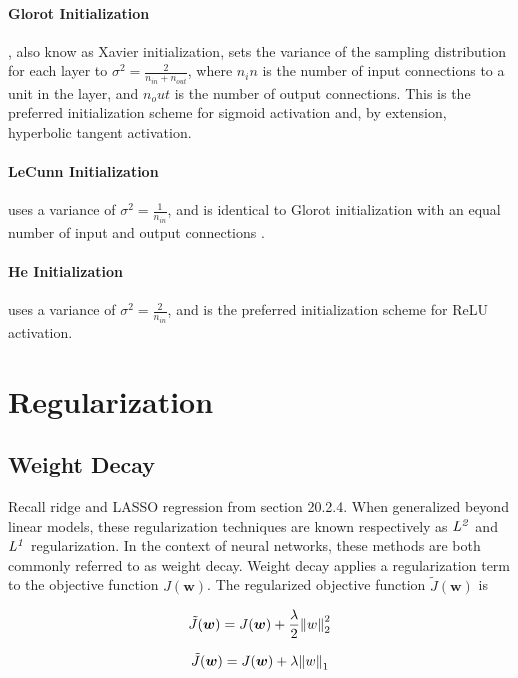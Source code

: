 \documentclass{article}
\begin{document}
\paragraph*{Glorot Initialization}, also know as Xavier initialization, sets the variance of the sampling distribution for each layer to \(\sigma^2 = \frac{2}{n_{in} + n_{out}}\), where \(n_in\) is the number of input connections to a unit in the layer, and \(n_out\) is the number of output connections. This is the preferred initialization scheme for sigmoid activation \cite{pml1book} and, by extension, hyperbolic tangent activation.

\paragraph*{LeCunn Initialization} uses a variance of \(\sigma^2 = \frac{1}{n_{in}}\), and is identical to Glorot initialization with an equal number of input and output connections \cite{pml1book}.

\paragraph*{He Initialization} uses a variance of \(\sigma^2 = \frac{2}{n_{in}}\), and is the preferred initialization scheme for ReLU activation. 

\section{Regularization} %

\subsection{Weight Decay} %

Recall ridge and LASSO regression from section 20.2.4. When generalized beyond linear models, these regularization techniques are known respectively as \(\it{L}^2\) and \(\it{L}^1\) regularization. In the context of neural networks, these methods are both commonly referred to as weight decay. Weight decay applies a regularization term to the objective function \(J(\bm{w})\). The regularized objective function \(\tilde{J}(\bm{w})\) is 

\[\tilde{J}(\bm{w}) = J(\bm{w}) +\frac{\lambda}{2}\norm{w}^2_2\]

\[\tilde{J}(\bm{w}) = J(\bm{w}) +\lambda\norm{w}_1\]
\end{document}
